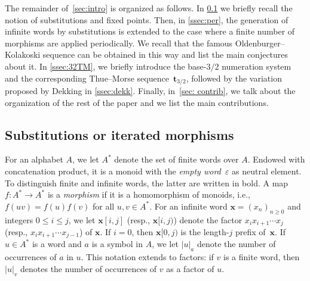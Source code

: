 \documentclass[12pt,reqno]{article}
\begin{document}
The remainder of~\cref{sec:intro} is organized as follows. In \cref{ssec:sub} we briefly recall the notion of substitutions and  fixed points. Then,  in \cref{ssec:per},  the generation of infinite words by substitutions is extended to the case where a finite number of morphisms are applied periodically.  We recall that the famous Oldenburger--Kolakoski sequence can be obtained in this way and list the main conjectures about it. In \cref{ssec:32TM}, we briefly introduce the base-$3/2$ numeration system and the corresponding Thue--Morse sequence~$\mathbf{t}_{3/2}$, followed by the variation proposed by Dekking in \cref{ssec:dekk}. Finally,  in~\cref{sec: contrib}, we talk about the organization of the rest of the paper and we list the main contributions.


\subsection{Substitutions or iterated morphisms}\label{ssec:sub}
For an alphabet $A$,  we let $A^*$ denote the set of finite words over $A$.  Endowed with concatenation product, it is a monoid with the \emph{empty word~$\varepsilon$} as neutral element. 
To distinguish finite and infinite words,  the latter are written in bold.
A map $f:A^*\to A^*$ is a {\em morphism} if it is a homomorphism of monoids, i.e., $f(uv)=f(u)f(v)$ for all $u,v\in A^*$. 
For an infinite word $\mathbf{x}=(x_n)_{n\ge 0}$ and integers $0\le i\le j$,  we let $\mathbf{x}[i,j]$ (resp.,   $\mathbf{x}[i,j)$) denote the factor $x_i x_{i+1}\cdots x_j$ (resp.,   $x_i x_{i+1}\cdots x_{j-1}$) of $\mathbf{x}$. If $i=0$, then $\mathbf{x}[0,j)$ is the  length-$j$ prefix of~$\mathbf{x}$. If $u\in A^*$ is a word and $a$ is a symbol in $A$, we let $|u|_a$ denote the number of occurrences of $a$ in $u$. This notation extends to factors: if $v$ is a finite word, then $|u|_v$ denotes the number of occurrences of $v$ as a factor of $u$.
\end{document}
